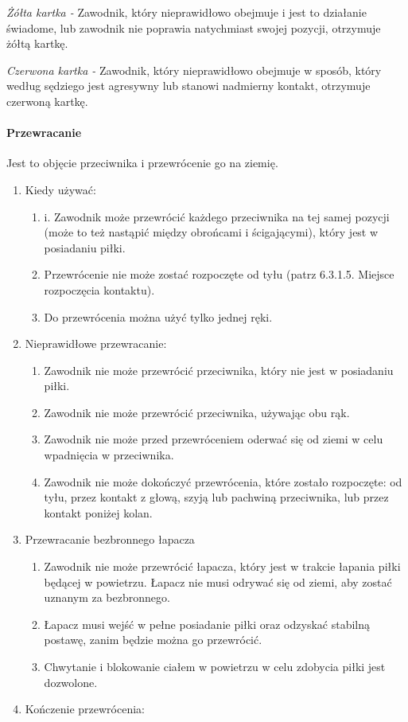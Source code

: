 \documentclass[12pt]{article}
\begin{document}
\emph{Żółta kartka -} Zawodnik, który nieprawidłowo obejmuje i jest to
działanie świadome, lub zawodnik nie poprawia natychmiast swojej
pozycji, otrzymuje żółtą kartkę.

\emph{Czerwona kartka -} Zawodnik, który nieprawidłowo obejmuje w
sposób, który według sędziego jest agresywny lub stanowi nadmierny
kontakt, otrzymuje czerwoną kartkę.

\paragraph{Przewracanie}
Jest to objęcie przeciwnika i
przewrócenie go na ziemię.

\begin{enumerate}
\item
    Kiedy używać:
  
  \begin{enumerate}
  \item
        i. Zawodnik może przewrócić każdego przeciwnika na tej samej pozycji
    (może to też nastąpić między obrońcami i ścigającymi), który jest w
    posiadaniu piłki.
      \item
        Przewrócenie nie może zostać rozpoczęte od tyłu (patrz 6.3.1.5.
    Miejsce rozpoczęcia kontaktu).
      \item
        Do przewrócenia można użyć tylko jednej ręki.
      \end{enumerate}
\item
    Nieprawidłowe przewracanie:
  
  \begin{enumerate}
  \item
        Zawodnik nie może przewrócić przeciwnika, który nie jest w
    posiadaniu piłki.
      \item
        Zawodnik nie może przewrócić przeciwnika, używając obu rąk.
      \item
        Zawodnik nie może przed przewróceniem oderwać się od ziemi w celu
    wpadnięcia w przeciwnika.
      \item
        Zawodnik nie może dokończyć przewrócenia, które zostało rozpoczęte:
    od tyłu, przez kontakt z głową, szyją lub pachwiną przeciwnika, lub
    przez kontakt poniżej kolan.
      \end{enumerate}
\item
    Przewracanie bezbronnego łapacza
  
  \begin{enumerate}
  \item
        Zawodnik nie może przewrócić łapacza, który jest w trakcie łapania
    piłki będącej w powietrzu. Łapacz nie musi odrywać się od ziemi, aby
    zostać uznanym za bezbronnego.
      \item
        Łapacz musi wejść w pełne posiadanie piłki oraz odzyskać stabilną
    postawę, zanim będzie można go przewrócić.
      \item
        Chwytanie i blokowanie ciałem w powietrzu w celu zdobycia piłki jest
    dozwolone.
      \end{enumerate}
\item
    Kończenie przewrócenia:
  

\end{enumerate}
\end{document}
